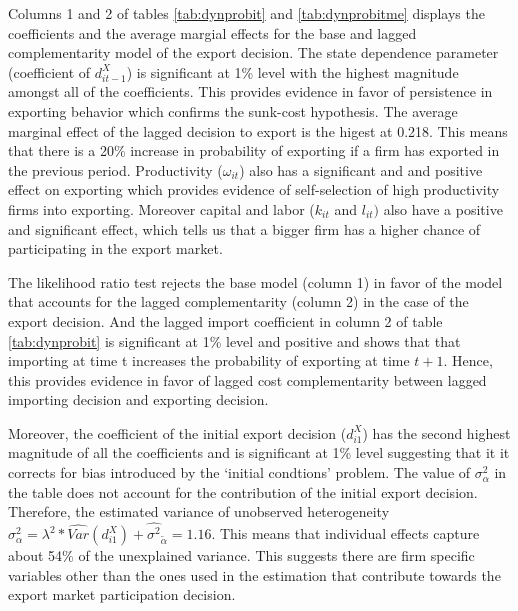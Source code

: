 \documentclass[12pt]{article}
\begin{document}
  Columns 1 and 2 of tables \ref{tab:dynprobit} and
  \ref{tab:dynprobitme} displays the coefficients and the average
  margial effects for the base and lagged complementarity model of the
  export decision. The state dependence parameter (coefficient of $d_{it-1}^{X}$) is 
  significant at 1\% level with the highest magnitude amongst all of
  the coefficients. This provides evidence in favor of  persistence in
  exporting behavior which confirms the sunk-cost hypothesis. The average marginal effect of the lagged
  decision to export is the higest at 0.218. This  means that there is a 20\% increase
  in probability of exporting if a firm has exported in the previous
  period.  Productivity ($\omega_{it}$) also has a significant and
  and positive effect on exporting which provides evidence of
  self-selection of high productivity firms into exporting. Moreover
  capital and labor ($k_{it}$ and $l_{it})$
  also have a positive and significant effect, which tells us that a
  bigger firm has a higher chance of participating in the export
  market. 


The likelihood ratio test  rejects the base model (column 1) in favor of the
model that accounts for the lagged complementarity (column 2) in the case of 
the export decision. And the lagged import coefficient in column 2 of table \ref{tab:dynprobit} is
  significant  at 1\% level and positive and shows that   that importing
  at time t increases the probability of exporting at time $t+1$.
  Hence, this provides evidence  in favor of  lagged cost complementarity
  between lagged importing decision  and exporting decision. 


Moreover, the coefficient
 of the initial export decision ($d_{i1}^{X}$) has the second highest
     magnitude  of all the coefficients and  is significant at 1\% level
suggesting that it it corrects for bias introduced by the `initial
condtions' problem. 
 The value of
  $\sigma^2_{\alpha}$ in the table does not account for the
  contribution of the initial export decision. Therefore, the estimated
  variance of 
  unobserved heterogeneity $\sigma^2_{\alpha}= \lambda^2 *
  \hat{Var}(d_{i1}^{X})+\hat{\sigma^2}_{\tilde{\alpha}}= 1.16$. This
  means that individual effects capture about 54\% of the unexplained
  variance. This suggests there are firm specific variables other than the ones used
  in the estimation that contribute towards the export market
  participation decision. 
\end{document}
